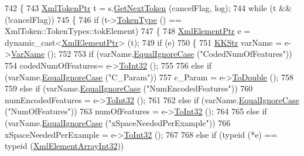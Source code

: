 \begin{DoxyCode}
742 \{
743   \hyperlink{class_k_k_b_1_1_xml_token}{XmlTokenPtr} t = s.\hyperlink{class_k_k_b_1_1_xml_stream_a87cc738b05c666cf5d5c25beaab477b4}{GetNextToken} (cancelFlag,  log);
744   \textcolor{keywordflow}{while}  (t  &&  (!cancelFlag))
745   \{
746     \textcolor{keywordflow}{if}  (t->\hyperlink{class_k_k_b_1_1_xml_token_ae98e2c1a798882647578cae4adcd7176}{TokenType} () == XmlToken::TokenTypes::tokElement)
747     \{
748       \hyperlink{class_k_k_b_1_1_xml_element}{XmlElementPtr} e = \textcolor{keyword}{dynamic\_cast<}\hyperlink{class_k_k_b_1_1_xml_element}{XmlElementPtr}\textcolor{keyword}{>} (t);
749       \textcolor{keywordflow}{if}  (e)
750       \{
751         \hyperlink{class_k_k_b_1_1_k_k_str}{KKStr} varName = e->\hyperlink{class_k_k_b_1_1_xml_element_aef57cf00be66a3a387ce849b35125f51}{VarName} ();
752 
753         \textcolor{keywordflow}{if}  (varName.\hyperlink{class_k_k_b_1_1_k_k_str_a562f9696417c53f66bc4088eac072ab5}{EqualIgnoreCase} (\textcolor{stringliteral}{"CodedNumOfFeatures"}))
754           codedNumOfFeatures= e->\hyperlink{class_k_k_b_1_1_xml_element_aac7463c7b305f66b5157f424a0a76363}{ToInt32} ();
755 
756         \textcolor{keywordflow}{else} \textcolor{keywordflow}{if}  (varName.\hyperlink{class_k_k_b_1_1_k_k_str_a562f9696417c53f66bc4088eac072ab5}{EqualIgnoreCase} (\textcolor{stringliteral}{"C\_Param"}))
757           c\_Param = e->\hyperlink{class_k_k_b_1_1_xml_element_ac32778396ab8bdb215ad38f2f33f05de}{ToDouble} ();
758 
759         \textcolor{keywordflow}{else} \textcolor{keywordflow}{if}  (varName.\hyperlink{class_k_k_b_1_1_k_k_str_a562f9696417c53f66bc4088eac072ab5}{EqualIgnoreCase} (\textcolor{stringliteral}{"NumEncodedFeatures"}))
760           numEncodedFeatures = e->\hyperlink{class_k_k_b_1_1_xml_element_aac7463c7b305f66b5157f424a0a76363}{ToInt32} ();
761 
762         \textcolor{keywordflow}{else} \textcolor{keywordflow}{if}  (varName.\hyperlink{class_k_k_b_1_1_k_k_str_a562f9696417c53f66bc4088eac072ab5}{EqualIgnoreCase} (\textcolor{stringliteral}{"NumOfFeatures"}))
763           numOfFeatures = e->\hyperlink{class_k_k_b_1_1_xml_element_aac7463c7b305f66b5157f424a0a76363}{ToInt32} ();
764 
765         \textcolor{keywordflow}{else} \textcolor{keywordflow}{if}  (varName.\hyperlink{class_k_k_b_1_1_k_k_str_a562f9696417c53f66bc4088eac072ab5}{EqualIgnoreCase} (\textcolor{stringliteral}{"xSpaceNeededPerExample"}))
766           xSpaceNeededPerExample = e->\hyperlink{class_k_k_b_1_1_xml_element_aac7463c7b305f66b5157f424a0a76363}{ToInt32} ();
767 
768         \textcolor{keywordflow}{else} \textcolor{keywordflow}{if}  (\textcolor{keyword}{typeid} (*e) == \textcolor{keyword}{typeid} (\hyperlink{class_k_k_b_1_1_xml_element_array_int32}{XmlElementArrayInt32}))

\end{DoxyCode}
